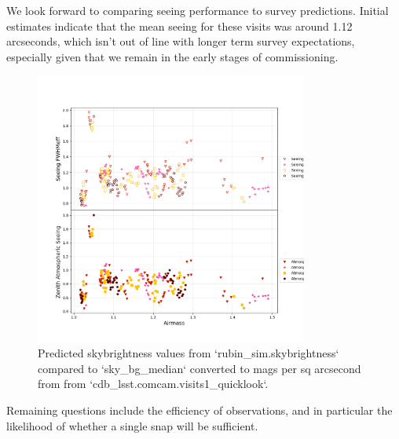  
We look forward to comparing seeing performance to survey predictions. Initial estimates indicate that the mean seeing for these visits was around 1.12 arcseconds, which isn't out of line with longer term survey expectations, especially given that we remain in the early stages of commissioning. 

\begin{figure}
    \centering
    \includegraphics[width=0.8\textwidth]{sp/seeing.png}
    \caption{Predicted skybrightness values from `rubin\_sim.skybrightness`  compared to `sky\_bg\_median` converted to mags per sq arcsecond  from  from `cdb\_lsst.comcam.visits1\_quicklook`.}
    \label{fig:seeing}
    \end{figure}
    
   
Remaining questions include the efficiency of observations, and in particular the likelihood of whether a single snap will be sufficient. 